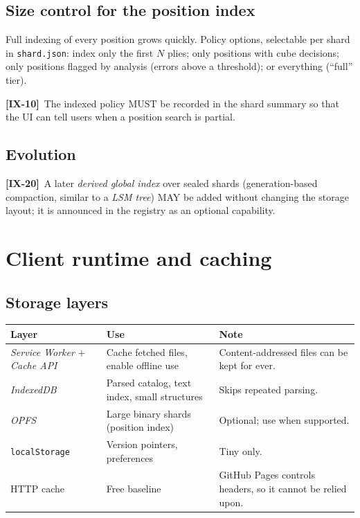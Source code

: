 \documentclass[11pt,a4paper]{article}
\newcommand{\kw}[1]{\textit{#1}\index{#1}}
\newcommand{\req}[2]{\par\smallskip\noindent\hypertarget{#1}{}\textbf{[#1]}\ #2\par}
\begin{document}
\subsection{Size control for the position index}
Full indexing of every position grows quickly. Policy options, selectable per shard in \texttt{shard.json}: index only the first $N$ plies; only positions with cube decisions; only positions flagged by analysis (errors above a threshold); or everything (``full'' tier).
\req{IX-10}{The indexed policy MUST be recorded in the shard summary so that the UI can tell users when a position search is partial.}

\subsection{Evolution}
\req{IX-20}{A later \emph{derived global index} over sealed shards (generation-based compaction, similar to a \kw{LSM tree}) MAY be added without changing the storage layout; it is announced in the registry as an optional capability.}

\section{Client runtime and caching}\label{sec:client}

\subsection{Storage layers}
\begin{longtable}{@{}p{3.3cm}p{5cm}p{5.8cm}@{}}
\toprule
\textbf{Layer} & \textbf{Use} & \textbf{Note}\\
\midrule
\endhead
\kw{Service Worker} + \kw{Cache API} & Cache fetched files, enable offline use & Content-addressed files can be kept for ever.\\
\kw{IndexedDB} & Parsed catalog, text index, small structures & Skips repeated parsing.\\
\kw{OPFS} & Large binary shards (position index) & Optional; use when supported.\\
\texttt{localStorage} & Version pointers, preferences & Tiny only.\\
HTTP cache & Free baseline & GitHub Pages controls headers, so it cannot be relied upon.\\
\bottomrule
\end{longtable}
\end{document}
